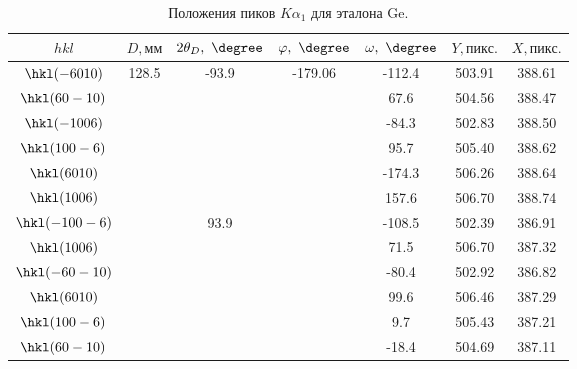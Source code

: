\begin{table}[ht!]
    \centering
    \begin{tabular}{ |c|c|c|c|c|c|c| }
        \hline
                   $hkl$ &           $D,\unit{мм}$ &  $2\theta_D, \ \degree$ &     $\varphi, \ \degree$ & $\omega, \ \degree$ &    $Y,\unit{пикс.}$ &    $X,\unit{пикс.}$ \\
        \hline
        $ \hkl(-6 0 10)$ & \multirow{12}{*}{128.5} &  \multirow{6}{*}{-93.9} & \multirow{12}{*}{-179.06}&              -112.4 &              503.91 &              388.61 \\
        $ \hkl(6 0 -10)$ &                         &                         &                          &                67.6 &              504.56 &              388.47 \\
        $ \hkl(-10 0 6)$ &                         &                         &                          &               -84.3 &              502.83 &              388.50 \\
        $ \hkl(10 0 -6)$ &                         &                         &                          &                95.7 &              505.40 &              388.62 \\
        $  \hkl(6 0 10)$ &                         &                         &                          &              -174.3 &              506.26 &              388.64 \\
        $  \hkl(10 0 6)$ &                         &                         &                          &               157.6 &              506.70 &              388.74 \\
        $\hkl(-10 0 -6)$ &                         &  \multirow{6}{*}{93.9}  &                          &              -108.5 &              502.39 &              386.91 \\
        $  \hkl(10 0 6)$ &                         &                         &                          &                71.5 &              506.70 &              387.32 \\
        $\hkl(-6 0 -10)$ &                         &                         &                          &               -80.4 &              502.92 &              386.82 \\
        $  \hkl(6 0 10)$ &                         &                         &                          &                99.6 &              506.46 &              387.29 \\
        $ \hkl(10 0 -6)$ &                         &                         &                          &                 9.7 &              505.43 &              387.21 \\
        $ \hkl(6 0 -10)$ &                         &                         &                          &               -18.4 &              504.69 &              387.11 \\
        \hline
    \end{tabular}
    \caption{Положения пиков $K\alpha_1$ для эталона Ge.}
    \label{tab:Ge}
\end{table}